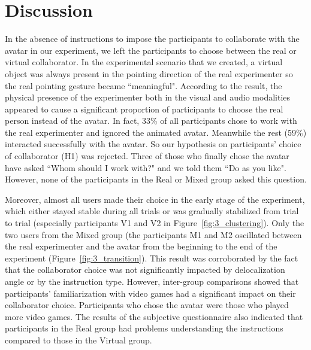 
\section{Discussion}
In the absence of instructions to impose the participants to collaborate with the avatar in our experiment, we left the participants to choose between the real or virtual collaborator. In the experimental scenario that we created, a virtual object was always present in the pointing direction of the real experimenter so the real pointing gesture became ``meaningful". According to the result, the physical presence of the experimenter both in the visual and audio modalities appeared to cause a significant proportion of participants to choose the real person instead of the avatar. In fact, 33\% of all participants chose to work with the real experimenter and ignored the animated avatar. Meanwhile the rest (59\%) interacted successfully with the avatar. So our hypothesis on participants' choice of collaborator (H1) was rejected. Three of those who finally chose the avatar have asked ``Whom should I work with?" and we told them ``Do as you like". However, none of the participants in the Real or Mixed group asked this question.

Moreover, almost all users made their choice in the early stage of the experiment, which either stayed stable during all trials or was gradually stabilized from trial to trial (especially participants V1 and V2 in Figure~\ref{fig:3_clustering}). Only the two users from the Mixed group (the participants M1 and M2 oscillated between the real experimenter and the avatar from the beginning to the end of the experiment (Figure~\ref{fig:3_transition}). This result was corroborated by the fact that the collaborator choice was not significantly impacted by delocalization angle or by the instruction type. However, inter-group comparisons showed that participants' familiarization with video games had a significant impact on their collaborator choice. Participants who chose the avatar were those who played more video games. The results of the subjective questionnaire also indicated that participants in the Real group had problems understanding the instructions compared to those in the Virtual group.

